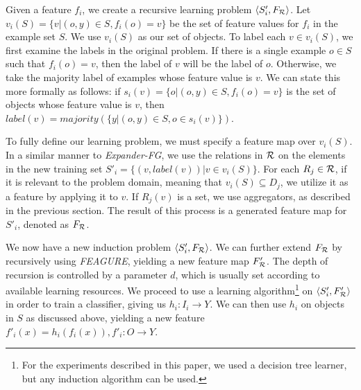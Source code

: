\documentclass[twoside,11pt]{article}
\theoremstyle{definition}
\begin{document}

Given a feature $f_{i}$, we create a recursive learning problem $\langle S'_i,F_{\cal R} \rangle$. %
 Let $v_i(S) = \{v | (o,y) \in S, f_{i}(o)=v\}$ be the set of feature values for $f_i$ in the example set $S$. %
We use $v_i(S)$ as our set of objects. To label each $v \in v_i(S)$, we first examine the labels in the original problem.
 If there is a single example $o \in S$ such that $f_i(o)=v$, then the label of $v$ will be the label of $o$. Otherwise, we take the majority label of examples whose feature value is $v$. We can state this more formally as follows: if $s_i(v)=\{o | (o,y)\in S, f_{i}(o)=v\}$ is the set of objects whose feature value is $v$, then $label(v)=majority(\{y|(o,y)\in S, o\in s_i(v)\})$.

To fully define our learning problem, we must specify a feature map over $v_i(S)$. In a similar manner to \emph{Expander-FG}, we use the relations in ${\cal R}$ on the elements in the new training set $S'_i = \{ (v, label(v)) | v \in v_i(S) \}$.
For each $R_j\in {\cal R}$, if it is relevant to the problem domain, meaning that $v_i(S)\subseteq D_j$, we utilize it as a feature by applying it to $v$. If $R_j(v)$ is a set, we use aggregators, as described in the previous section. 
The result of this process is a generated feature map for $S'_i$, denoted as $F_{\cal R}$. 

We now have a new induction problem $\langle S'_i,F_{\cal R} \rangle$.
We can further extend $F_{\cal R}$ by recursively using \emph{FEAGURE}, yielding a new feature map $F'_{\cal R}$. The depth of recursion is controlled by a parameter $d$, which is usually set according to available learning resources.
We proceed to use a learning algorithm\footnote{For the experiments described in this paper, we used a decision tree learner, but any induction algorithm can be used.} on $\langle S'_i,F'_{\cal R} \rangle$ in order to train a classifier, giving us $h_i:I_i\rightarrow Y$. We can then use $h_i$ on objects in $S$ as discussed above, yielding a new feature $f'_{i}(x)=h_{i}(f_{i}(x)), f'_{i}:O\rightarrow Y$. 
\end{document}
